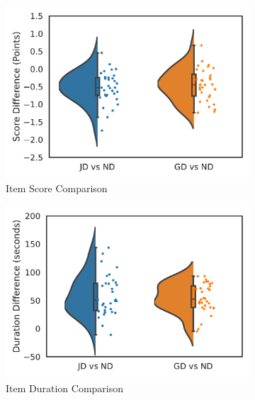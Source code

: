 \documentclass[authorversion,nonacm]{acmart}
\begin{document}
\begin{figure}
  \begin{subfigure}[b]{0.3\textwidth}
    \includegraphics[width=\textwidth]{./imgs/score_dif.pdf}
    \caption{Item Score Comparison}
    \label{fig:score_dif}
  \end{subfigure}%
  \hfill
  \begin{subfigure}[b]{0.3\textwidth}
    \includegraphics[width=\textwidth]{./imgs/dur_dif.pdf}
    \caption{Item Duration Comparison}
    \label{fig:dur_dif}
  \end{subfigure}%
  \hfill
  \begin{subfigure}[b]{0.30\textwidth}

\end{subfigure}
\end{figure}
\end{document}
